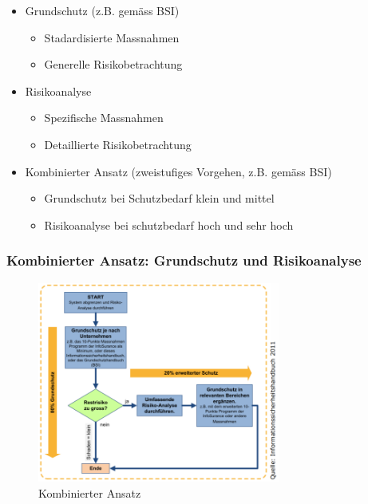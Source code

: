 \documentclass[10pt,a4paper]{article}
\begin{document}
\begin{itemize}[noitemsep,topsep=0pt,leftmargin=*]
    \item Grundschutz (z.B. gemäss BSI)
    \begin{itemize}[noitemsep,topsep=0pt,leftmargin=*]
        \item Stadardisierte Massnahmen
        \item Generelle Risikobetrachtung
    \end{itemize}
    \item Risikoanalyse
    \begin{itemize}[noitemsep,topsep=0pt,leftmargin=*]
        \item Spezifische Massnahmen
        \item Detaillierte Risikobetrachtung
    \end{itemize}
    \item Kombinierter Ansatz (zweistufiges Vorgehen, z.B. gemäss BSI)
    \begin{itemize}[noitemsep,topsep=0pt,leftmargin=*]
        \item Grundschutz bei Schutzbedarf klein und mittel
        \item Risikoanalyse bei schutzbedarf hoch und sehr hoch
    \end{itemize}
\end{itemize}


\subsubsection*{Kombinierter Ansatz: Grundschutz und Risikoanalyse}
\begin{figure}[H]
    \begin{center}
    \includegraphics[width=8cm]{images/Kombinierter_Ansatz.png}
    \caption{Kombinierter Ansatz}
    \label{Kombinierter Ansatz}
    \end{center}
\end{figure}
\end{document}
